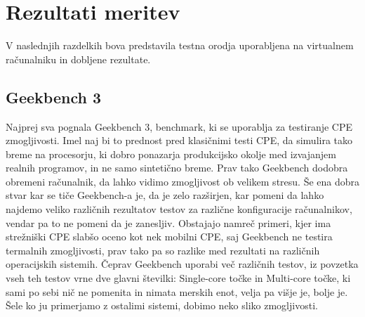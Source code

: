 \section{Rezultati meritev}

V naslednjih razdelkih bova predstavila testna orodja uporabljena na virtualnem računalniku in dobljene rezultate.

\subsection{Geekbench 3}
Najprej sva pognala Geekbench 3, benchmark, ki se uporablja za testiranje CPE zmogljivosti. Imel naj bi to prednost pred klasičnimi testi CPE, da simulira tako breme na procesorju, ki dobro ponazarja produkcijsko okolje med izvajanjem realnih programov, in ne samo sintetično breme. Prav tako Geekbench dodobra obremeni računalnik, da lahko vidimo zmogljivost ob velikem stresu. Še ena dobra stvar kar se tiče Geekbench-a je, da je zelo razširjen, kar pomeni da lahko najdemo veliko različnih rezultatov testov za različne konfiguracije računalnikov, vendar pa to ne pomeni da je zanesljiv. Obstajajo namreč primeri, kjer ima strežniški CPE slabšo oceno kot nek mobilni CPE, saj Geekbench ne testira termalnih zmogljivosti, prav tako pa so razlike med rezultati na različnih operacijskih sistemih. Čeprav Geekbench uporabi več različnih testov, iz povzetka vseh teh testov vrne dve glavni številki: Single-core točke in Multi-core točke, ki sami po sebi nič ne pomenita in nimata merskih enot, velja pa višje je, bolje je. Šele ko ju primerjamo z ostalimi sistemi, dobimo neko sliko zmogljivosti. 

